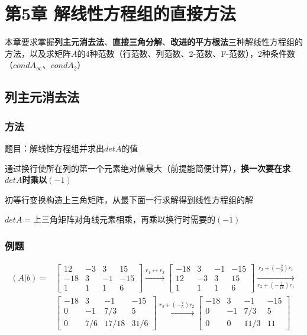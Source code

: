 \section{第5章 \quad 解线性方程组的直接方法}

本章要求掌握\textbf{列主元消去法}、\textbf{直接三角分解}、\textbf{改进的平方根法}三种解线性方程组的方法，以及求矩阵$A$的4种范数（行范数、列范数、2-范数、F-范数），2种条件数（$condA_\infty$、$condA_2$）

\subsection{列主元消去法}

\subsubsection{方法}

题目：解线性方程组并求出$detA$的值

通过换行使所在列的第一个元素绝对值最大（前提能简便计算），\textbf{换一次要在求$detA$时乘以$(-1)$}

初等行变换构造上三角矩阵，从最下面一行求解得到线性方程组的解

$detA=$上三角矩阵对角线元素相乘，再乘以换行时需要的$(-1)$

\subsubsection{例题}

\[
\begin{aligned}
(A|b) = &
\left[
\begin{array}{ccc|c}
12 & -3 & 3 & 15 \\
-18 & 3 & -1 & -15 \\
1 & 1 & 1 & 6
\end{array}
\right] 
\xrightarrow{r_1 \leftrightarrow r_2} 
\left[
\begin{array}{ccc|c}
-18 & 3 & -1 & -15 \\
12 & -3 & 3 & 15 \\
1 & 1 & 1 & 6
\end{array}
\right]
\underset{r_3 + \left( -\frac{1}{18} \right) r_1}{\overset{r_2 + \left( -\frac{2}{3} \right) r_1}{\xrightarrow{\hspace{2cm}}}} \\
&\left[
\begin{array}{ccc|c}
-18 & 3 & -1 & -15 \\
0 & -1 & 7/3 & 5 \\
0 & 7/6 & 17/18 & 31/6
\end{array}
\right]
\xrightarrow{r_3 + \left( -\frac{7}{6} \right) r_2} 
\left[
\begin{array}{ccc|c}
-18 & 3 & -1 & -15 \\
0 & -1 & 7/3 & 5 \\
0 & 0 & 11/3 & 11
\end{array}
\right]
\end{aligned}
\]

